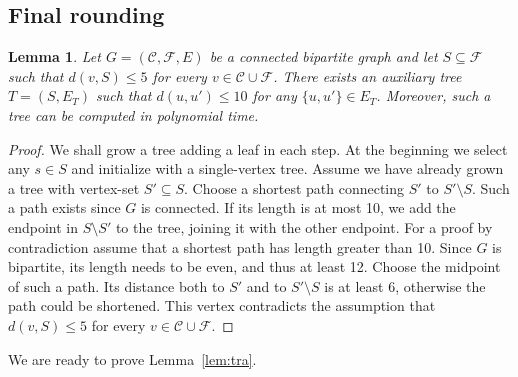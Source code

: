\documentclass{article}
\newcommand{\F}{\mathcal{F}}
\newcommand{\C}{\mathcal{C}}
\newcommand{\sub}{\subseteq}
\newcommand{\sm}{\setminus}
\theoremstyle{plain}
\newtheorem{lemma}[theorem]{Lemma}
\theoremstyle{definition}
\begin{document}
\subsection{Final rounding}
\label{ssec:tree-rounding}

\begin{lemma}
\label{lem:build-tree}
Let $G=(\C,\F,E)$ be a connected bipartite graph
and let $S \subseteq \F$ such that $d(v,S)\le 5$ for every $v\in \C\cup \F$.
There exists an auxiliary tree $T=(S,E_T)$ 
such that $d(u,u')\le 10$ for any $\{u,u'\}\in E_T$.
Moreover, such a tree can be computed in polynomial time.
\end{lemma}
\begin{proof}
We shall grow a tree adding a leaf in each step.
At the beginning we select any $s\in S$ and initialize with a single-vertex
tree.
Assume we have already grown a tree with vertex-set $S'\sub S$.
Choose a shortest path connecting $S'$ to $S'\sm S$. Such a path exists since
$G$ is connected. If its length is at most 10, we add the endpoint in
$S\sm S'$ to the tree, joining it with the other endpoint.
For a proof by contradiction assume that a shortest path has length greater than
10. Since $G$ is bipartite, its length needs to be even, and thus at least 12.
Choose the midpoint of such a path. Its distance both
to $S'$ and to $S'\sm S$ is at least 6, otherwise the path could be shortened.
This vertex contradicts the assumption that $d(v,S)\le 5$ for every $v\in \C\cup
\F$.
\end{proof}

We are ready to prove Lemma~\ref{lem:tra}.
\end{document}
